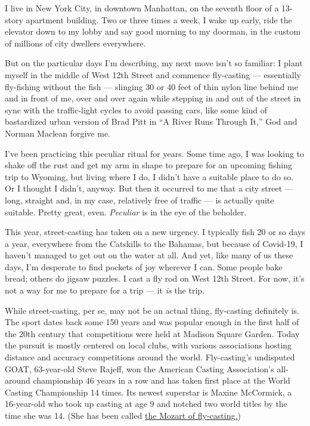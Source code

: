 I live in New York City, in downtown Manhattan, on the seventh floor of
a 13-story apartment building. Two or three times a week, I wake up
early, ride the elevator down to my lobby and say good morning to my
doorman, in the custom of millions of city dwellers everywhere.

But on the particular days I'm describing, my next move isn't so
familiar: I plant myself in the middle of West 12th Street and commence
fly-casting --- essentially fly-fishing without the fish --- slinging 30
or 40 feet of thin nylon line behind me and in front of me, over and
over again while stepping in and out of the street in sync with the
traffic-light cycles to avoid passing cars, like some kind of
bastardized urban version of Brad Pitt in ``A River Runs Through It,''
God and Norman Maclean forgive me.

I've been practicing this peculiar ritual for years. Some time ago, I
was looking to shake off the rust and get my arm in shape to prepare for
an upcoming fishing trip to Wyoming, but living where I do, I didn't
have a suitable place to do so. Or I thought I didn't, anyway. But then
it occurred to me that a city street --- long, straight and, in my case,
relatively free of traffic --- is actually quite suitable. Pretty great,
even. \emph{Peculiar} is in the eye of the beholder.

This year, street-casting has taken on a new urgency. I typically fish
20 or so days a year, everywhere from the Catskills to the Bahamas, but
because of Covid-19, I haven't managed to get out on the water at all.
And yet, like many of us these days, I'm desperate to find pockets of
joy wherever I can. Some people bake bread; others do jigsaw puzzles. I
cast a fly rod on West 12th Street. For now, it's not a way for me to
prepare for a trip --- it \emph{is} the trip.

While street-casting, per se, may not be an actual thing, fly-casting
definitely is. The sport dates back some 150 years and was popular
enough in the first half of the 20th century that competitions were held
at Madison Square Garden. Today the pursuit is mostly centered on local
clubs, with various associations hosting distance and accuracy
competitions around the world. Fly-casting's undisputed GOAT,
63-year-old Steve Rajeff, won the American Casting Association's
all-around championship 46 years in a row and has taken first place at
the World Casting Championship 14 times. Its newest superstar is Maxine
McCormick, a 16-year-old who took up casting at age 9 and notched two
world titles by the time she was 14. (She has been called
\href{https://www.nytimes.com/2018/08/19/sports/maxine-mccormick.html}{the
Mozart of fly-casting.})

